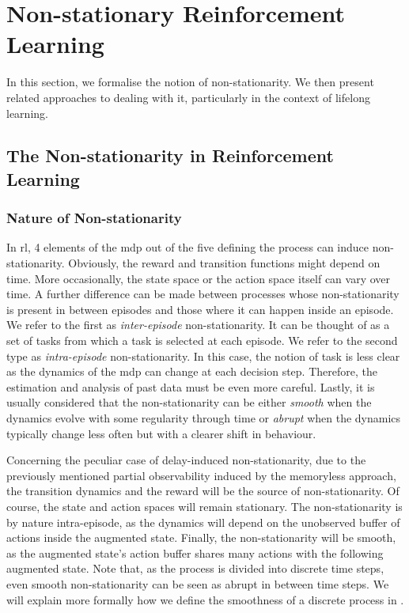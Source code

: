 \section{Non-stationary Reinforcement Learning}

In this section, we formalise the notion of non-stationarity. 
We then present related approaches to dealing with it, particularly in the context of lifelong learning.   


\subsection{The Non-stationarity in Reinforcement Learning}
\label{subsec:nature_ns}
\subsubsection{Nature of Non-stationarity}
In \gls{rl}, 4 elements of the \gls{mdp} out of the five defining the process can induce non-stationarity. 
Obviously, the reward and transition functions might depend on time. 
More occasionally, the state space or the action space itself can vary over time. 
A further difference can be made between processes whose non-stationarity is present in between episodes and those where it can happen inside an episode. 
We refer to the first as \emph{inter-episode} non-stationarity. 
It can be thought of as a set of tasks from which a task is selected at each episode. 
We refer to the second type as \emph{intra-episode} non-stationarity. 
In this case, the notion of task is less clear as the dynamics of the \gls{mdp}  can change at each decision step. 
Therefore, the estimation and analysis of past data must be even more careful.
Lastly, it is usually considered that the non-stationarity can be either \emph{smooth} when the dynamics evolve with some regularity through time or \emph{abrupt} when the dynamics typically change less often but with a clearer shift in behaviour. 

Concerning the peculiar case of delay-induced non-stationarity, due to the previously mentioned partial observability induced by the memoryless approach, the transition dynamics and the reward will be the
source of non-stationarity. 
Of course, the state and action spaces will remain stationary. 
The non-stationarity is by nature intra-episode, as the dynamics will depend on the unobserved buffer of actions inside the augmented state.
Finally, the non-stationarity will be smooth, as the augmented state's action buffer shares many actions with the following augmented state.
Note that, as the process is divided into discrete time steps, even smooth non-stationarity can be seen as abrupt in between time steps. 
We will explain more formally how we define the smoothness of a discrete process in .


